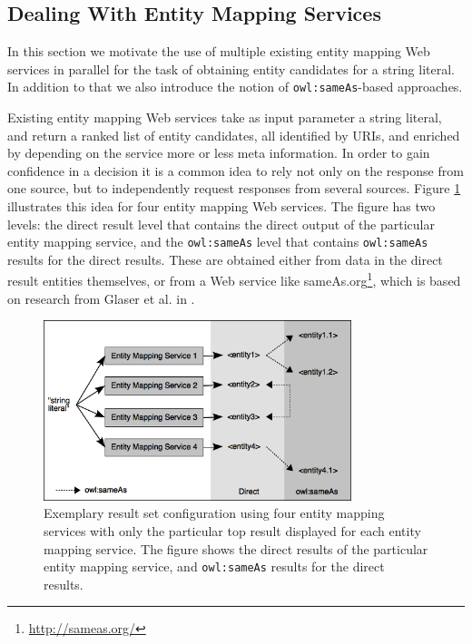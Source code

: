 \documentclass[twocolumn]{article}
\begin{document}
\subsection{Dealing With Entity Mapping Services}

In this section we motivate the use of multiple existing entity mapping Web services in parallel for the task of
obtaining entity candidates for a string literal. In addition to that we also introduce the notion of
\texttt{owl:sameAs}-based approaches.

Existing entity mapping Web services take as input parameter a string literal, and return a ranked list of entity
candidates, all identified by URIs, and enriched by depending on the service more or less meta information. In order to
gain confidence in a decision it is a common idea to rely not only on the response from one source, but to
independently request responses from several sources. Figure \ref{fig:diagram} illustrates this idea for four entity
mapping Web services. The figure has two levels: the direct result level that contains the direct output of the
particular entity mapping service, and the \texttt{owl:sameAs} level that contains \texttt{owl:sameAs} results for the
direct results. These are obtained either from data in the direct result entities themselves, or from a Web service
like sameAs.org\footnote{\url{http://sameas.org/}}, which is based on research from Glaser et al. in
\cite{Glaser:SameAs}.

\begin{figure}
 \centering
 \includegraphics[width=0.8\textwidth]{diagram.png}
 \caption{Exemplary result set configuration using four entity mapping services with only the particular top result displayed for each entity mapping service. The figure shows the direct results of the particular entity mapping service, and \texttt{owl:sameAs} results for the direct results.}
 \label{fig:diagram}
\end{figure}
\end{document}
